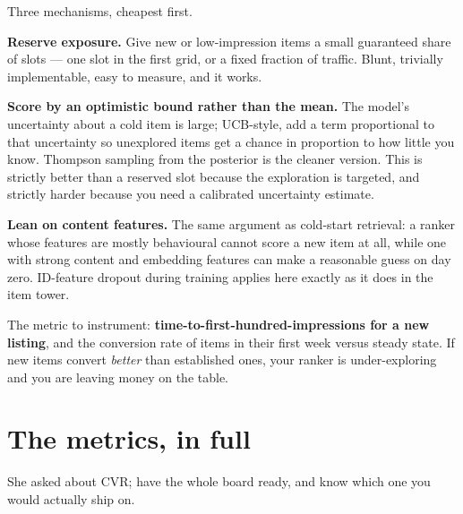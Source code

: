 \documentclass[10pt,twoside]{book}
\newcommand{\cchapter}[1]{\chapter{#1}}
\begin{document}
Three mechanisms, cheapest first.\par
\textbf{Reserve exposure.} Give new or low-impression items a small guaranteed share of slots --- one slot in the first grid, or a fixed fraction of traffic. Blunt, trivially implementable, easy to measure, and it works.\par
\textbf{Score by an optimistic bound rather than the mean.} The model's uncertainty about a cold item is large; UCB-style, add a term proportional to that uncertainty so unexplored items get a chance in proportion to how little you know. Thompson sampling from the posterior is the cleaner version. This is strictly better than a reserved slot because the exploration is targeted, and strictly harder because you need a calibrated uncertainty estimate.\par
\textbf{Lean on content features.} The same argument as cold-start retrieval: a ranker whose features are mostly behavioural cannot score a new item at all, while one with strong content and embedding features can make a reasonable guess on day zero. ID-feature dropout during training applies here exactly as it does in the item tower.\par
The metric to instrument: \textbf{time-to-first-hundred-impressions for a new listing}, and the conversion rate of items in their first week versus steady state. If new items convert \textit{better} than established ones, your ranker is under-exploring and you are leaving money on the table.\par
\cchapter{The metrics, in full}
She asked about CVR; have the whole board ready, and know which one you would actually ship on.\par
\end{document}
